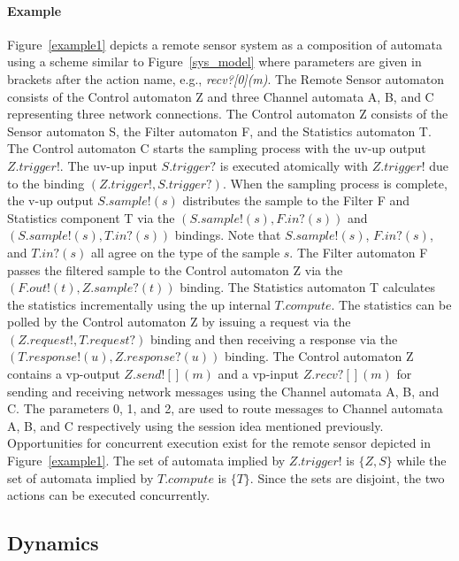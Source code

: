 \paragraph*{Example}
Figure~\ref{example1} depicts a remote sensor system as a composition of automata using a scheme similar to Figure~\ref{sys_model} where parameters are given in brackets after the action name, e.g., \emph{recv?[0](m)}.
The Remote Sensor automaton consists of the Control automaton Z and three Channel automata A, B, and C representing three network connections.
The Control automaton Z consists of the Sensor automaton S, the Filter automaton F, and the Statistics automaton T.
The Control automaton C starts the sampling process with the uv-up output $Z.trigger!$.
The uv-up input $S.trigger?$ is executed atomically with $Z.trigger!$ due to the binding $(Z.trigger!, S.trigger?)$.
When the sampling process is complete, the v-up output $S.sample!(s)$ distributes the sample to the Filter F and Statistics component T via the $(S.sample!(s), F.in?(s))$ and $(S.sample!(s), T.in?(s))$ bindings.
Note that $S.sample!(s)$, $F.in?(s)$, and $T.in?(s)$ all agree on the type of the sample $s$.
The Filter automaton F passes the filtered sample to the Control automaton Z via the $(F.out!(t), Z.sample?(t))$ binding.
The Statistics automaton T calculates the statistics incrementally using the up internal $T.compute$.
The statistics can be polled by the Control automaton Z by issuing a request via the $(Z.request!, T.request?)$ binding and then receiving a response via the $(T.response!(u), Z.response?(u))$ binding.
The Control automaton Z contains a vp-output $Z.send![](m)$ and a vp-input $Z.recv?[](m)$ for sending and receiving network messages using the Channel automata A, B, and C.
The parameters 0, 1, and 2, are used to route messages to Channel automata A, B, and C respectively using the session idea mentioned previously.
Opportunities for concurrent execution exist for the remote sensor depicted in Figure~\ref{example1}.
The set of automata implied by $Z.trigger!$ is $\{Z, S\}$ while the set of automata implied by $T.compute$ is $\{T\}$.
Since the sets are disjoint, the two actions can be executed concurrently.

\subsection{Dynamics\label{dynamics}}

